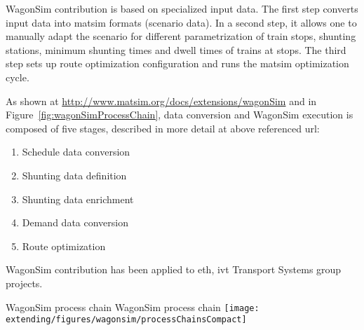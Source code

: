 WagonSim \gls{contribution} is based on specialized input data. 
The first step converts input data into \gls{matsim} formats (scenario data). In a second step, it allows one to manually adapt the scenario for different parametrization of train stops, shunting stations, minimum shunting times and dwell times of trains at stops. 
The third step sets up route optimization configuration and runs the \gls{matsim} optimization cycle.

As shown at \url{http://www.matsim.org/docs/extensions/wagonSim} and in Figure~\ref{fig:wagonSimProcessChain}, data conversion and WagonSim execution is composed of five stages, described in more detail at above referenced url:
%
\begin{enumerate}[label=\emph{\Alph*})]
\item Schedule data conversion
\item Shunting data definition
\item Shunting data enrichment
\item Demand data conversion
\item Route optimization
\end{enumerate}
%
WagonSim \gls{contribution} has been applied to \gls{eth}, \gls{ivt} Transport Systems group projects.

\createfigure%
{WagonSim process chain}%
{WagonSim process chain}%
{\label{fig:wagonSimProcessChain}}%
{\texttt{[image: extending/figures/wagonsim/processChainsCompact]}}%
{}

